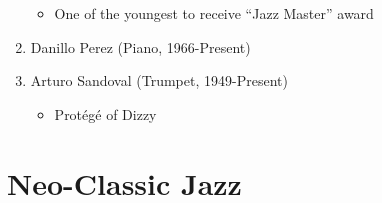 \documentclass[]{article}
\providecommand{\tightlist}{%
  \setlength{\itemsep}{0pt}\setlength{\parskip}{0pt}}
\begin{document}
\begin{enumerate}
  \begin{itemize}
  \tightlist
  \item
    One of the youngest to receive ``Jazz Master'' award
  \end{itemize}
\item
  Danillo Perez (Piano, 1966-Present)
\item
  Arturo Sandoval (Trumpet, 1949-Present)

  \begin{itemize}
  \tightlist
  \item
    Protégé of Dizzy
  \end{itemize}
\end{enumerate}

\section{Neo-Classic Jazz}\label{neo-classic-jazz}
\end{document}
